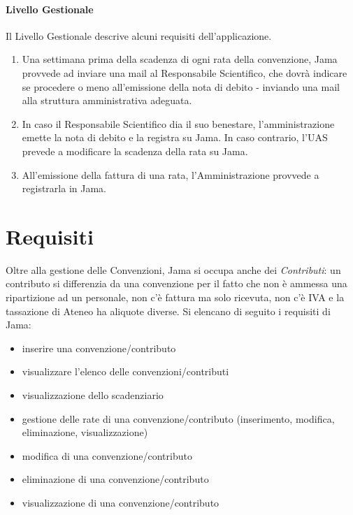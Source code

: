 \paragraph{Livello Gestionale}
Il Livello Gestionale descrive alcuni requisiti dell'applicazione.\newline
\begin{enumerate}
\item Una settimana prima della scadenza di ogni rata della convenzione, Jama provvede ad inviare una mail al Responsabile Scientifico, che dovrà indicare se procedere o meno all'emissione della nota di debito - inviando una mail alla struttura amministrativa adeguata.
\item In caso il Responsabile Scientifico dia il suo benestare, l'amministrazione emette la nota di debito e la registra su Jama. In caso contrario, l'UAS prevede a modificare la scadenza della rata su Jama.
\item All'emissione della fattura di una rata, l'Amministrazione provvede a registrarla in Jama.\newline
\end{enumerate}

\section{Requisiti}
Oltre alla gestione delle Convenzioni, Jama si occupa anche dei \textsl{Contributi}: un contributo si differenzia da una convenzione per il fatto che non è ammessa una ripartizione ad un personale, non c'è fattura ma solo ricevuta, non c'è IVA e la tassazione di Ateneo ha aliquote diverse.\newline
Si elencano di seguito i requisiti di Jama:

\begin{itemize}
\item inserire una convenzione/contributo
\item visualizzare l'elenco delle convenzioni/contributi
\item visualizzazione dello scadenziario
\item gestione delle rate di una convenzione/contributo (inserimento, modifica, eliminazione, visualizzazione)
\item modifica di una convenzione/contributo
\item eliminazione di una convenzione/contributo
\item visualizzazione di una convenzione/contributo\newline
\end{itemize}

